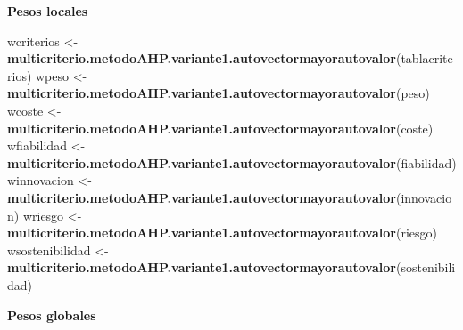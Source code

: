 \documentclass[
]{article}
\newenvironment{Shaded}{\begin{snugshade}}{\end{snugshade}}
\newcommand{\FunctionTok}[1]{\textcolor[rgb]{0.13,0.29,0.53}{\textbf{#1}}}
\newcommand{\NormalTok}[1]{#1}
\newcommand{\OtherTok}[1]{\textcolor[rgb]{0.56,0.35,0.01}{#1}}
\newcommand{\SpecialCharTok}[1]{\textcolor[rgb]{0.81,0.36,0.00}{\textbf{#1}}}
\begin{document}
\textbf{Pesos locales}

\begin{Shaded}
\begin{Highlighting}[]
\NormalTok{wcriterios }\OtherTok{\textless{}{-}} \FunctionTok{multicriterio.metodoAHP.variante1.autovectormayorautovalor}\NormalTok{(tablacriterios)}
\NormalTok{wpeso }\OtherTok{\textless{}{-}} \FunctionTok{multicriterio.metodoAHP.variante1.autovectormayorautovalor}\NormalTok{(peso)}
\NormalTok{wcoste }\OtherTok{\textless{}{-}} \FunctionTok{multicriterio.metodoAHP.variante1.autovectormayorautovalor}\NormalTok{(coste)}
\NormalTok{wfiabilidad }\OtherTok{\textless{}{-}} \FunctionTok{multicriterio.metodoAHP.variante1.autovectormayorautovalor}\NormalTok{(fiabilidad)}
\NormalTok{winnovacion }\OtherTok{\textless{}{-}} \FunctionTok{multicriterio.metodoAHP.variante1.autovectormayorautovalor}\NormalTok{(innovacion)}
\NormalTok{wriesgo }\OtherTok{\textless{}{-}} \FunctionTok{multicriterio.metodoAHP.variante1.autovectormayorautovalor}\NormalTok{(riesgo)}
\NormalTok{wsostenibilidad }\OtherTok{\textless{}{-}} \FunctionTok{multicriterio.metodoAHP.variante1.autovectormayorautovalor}\NormalTok{(sostenibilidad)}
\end{Highlighting}
\end{Shaded}

\textbf{Pesos globales}

\begin{Shaded}
\end{Shaded}
\end{document}
